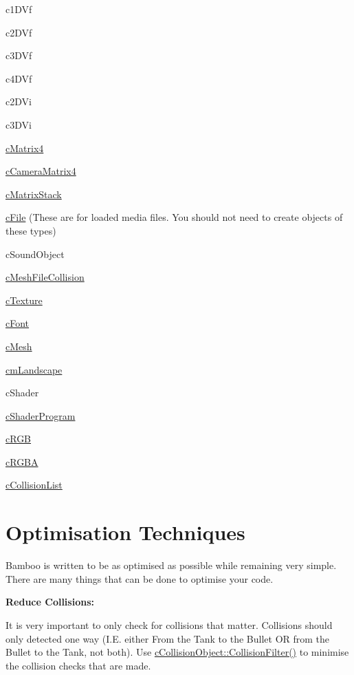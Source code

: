 \begin{DoxyItemize}
\item c1DVf
\item c2DVf
\item c3DVf
\item c4DVf
\item c2DVi
\item c3DVi
\item \hyperlink{classc_matrix4}{cMatrix4}
\item \hyperlink{classc_camera_matrix4}{cCameraMatrix4}
\item \hyperlink{classc_matrix_stack}{cMatrixStack}
\item \hyperlink{classc_file}{cFile} (These are for loaded media files. You should not need to create objects of these types)
\begin{DoxyItemize}
\item cSoundObject
\item \hyperlink{classc_mesh_file_collision}{cMeshFileCollision}
\item \hyperlink{classc_texture}{cTexture}
\item \hyperlink{classc_font}{cFont}
\item \hyperlink{classc_mesh}{cMesh}
\item \hyperlink{classcm_landscape}{cmLandscape}
\item cShader
\item \hyperlink{classc_shader_program}{cShaderProgram}
\end{DoxyItemize}
\item \hyperlink{classc_r_g_b}{cRGB}
\item \hyperlink{classc_r_g_b_a}{cRGBA}
\item \hyperlink{classc_collision_list}{cCollisionList}
\end{DoxyItemize}\hypertarget{_reference_lists_OptimisationTechniques}{}\section{Optimisation Techniques}\label{_reference_lists_OptimisationTechniques}
Bamboo is written to be as optimised as possible while remaining very simple. There are many things that can be done to optimise your code. \par
 {\bfseries Reduce Collisions:} \par
 It is very important to only check for collisions that matter. Collisions should only detected one way (I.E. either From the Tank to the Bullet OR from the Bullet to the Tank, not both). Use \hyperlink{classc_collision_object_a1490cdf75c8037049bfa7891aa8756b7}{cCollisionObject::CollisionFilter()} to minimise the collision checks that are made. \par
